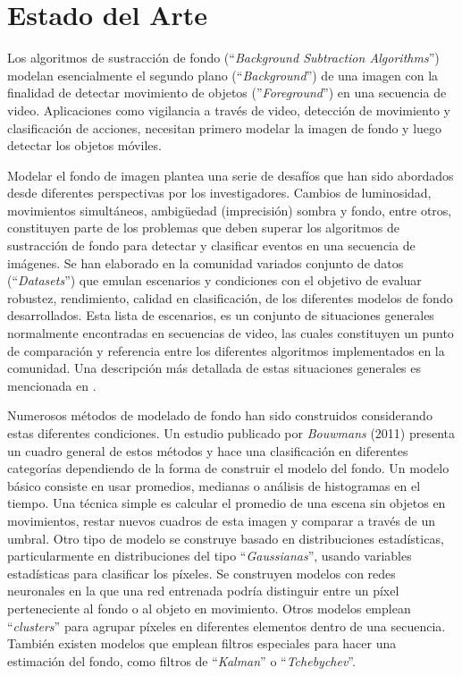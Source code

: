 \chapter{Estado del Arte}\label{chap:estado_del_arte}


\indent Los algoritmos de sustracción de fondo (``\textit{Background Subtraction Algorithms}'') modelan esencialmente el segundo plano (``\textit{Background}'') de una imagen con la finalidad de detectar movimiento de objetos (''\textit{Foreground}'') en una secuencia de video. Aplicaciones como vigilancia a través de video, detección de movimiento y clasificación de acciones, necesitan primero modelar la imagen de fondo y luego detectar los objetos móviles.

\indent Modelar el fondo de imagen plantea una serie de desafíos que han sido abordados desde diferentes perspectivas por los investigadores. Cambios de luminosidad, movimientos simultáneos, ambigüedad (imprecisión) sombra y fondo, entre otros, constituyen parte de los problemas que deben superar los algoritmos de sustracción de fondo para detectar y clasificar eventos en una secuencia de imágenes. Se han elaborado en la comunidad variados conjunto de datos (``\textit{Datasets}'') \cite{singh_muhavi_2010, weinland_free_2006, schuldt_recognizing_2004, gross_cmu_2001, gorelick_actions_2007} que emulan escenarios y condiciones con el objetivo de evaluar robustez, rendimiento, calidad en clasificación, de los diferentes modelos de fondo desarrollados. Esta lista de escenarios, es un conjunto de situaciones generales normalmente encontradas en secuencias de video, las cuales constituyen un punto de comparación y referencia entre los diferentes algoritmos implementados en la comunidad. Una descripción más detallada de estas situaciones generales es mencionada en \cite{toyama_wallflower_1999}.

\indent Numerosos métodos de modelado de fondo han sido construidos considerando estas diferentes condiciones. Un estudio publicado por \textit{Bouwmans}\cite{bouwmans_recent_2011} (2011)  presenta un cuadro general de estos métodos y hace una clasificación en diferentes categorías dependiendo de la forma de construir el modelo del fondo. Un modelo básico consiste en usar promedios, medianas o análisis de histogramas en el tiempo. Una técnica simple es calcular el promedio de una escena sin objetos en movimientos, restar nuevos cuadros de esta imagen y comparar a través de un umbral. Otro tipo de modelo se construye basado en distribuciones estadísticas, particularmente en distribuciones del tipo ``\textit{Gaussianas}'', usando variables estadísticas para clasificar los píxeles. Se construyen modelos con redes neuronales en la que una red entrenada podría distinguir entre un píxel perteneciente al fondo o al objeto en movimiento. Otros modelos emplean ``\textit{clusters}'' para agrupar píxeles en diferentes elementos dentro de una secuencia. También existen modelos que emplean filtros especiales para hacer una estimación del fondo, como filtros de ``\textit{Kalman}'' o ``\textit{Tchebychev}''.  

